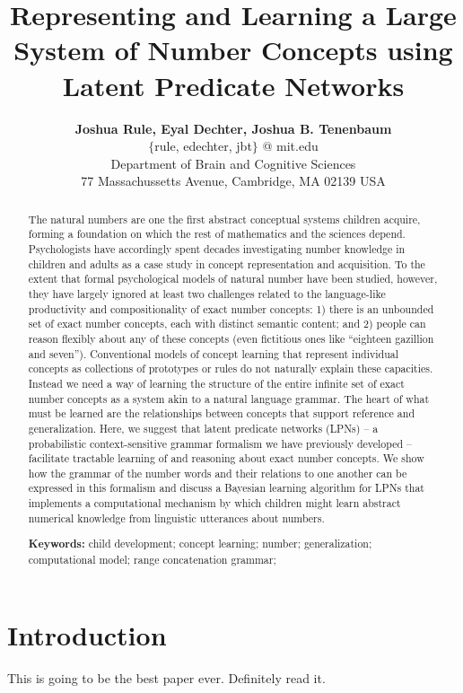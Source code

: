 \documentclass[10pt,letterpaper]{article}
\title{Representing and Learning a Large System of Number Concepts using Latent Predicate Networks}
\author{{\large \bf Joshua Rule, Eyal Dechter, Joshua B. Tenenbaum} \\
  $\{$rule, edechter, jbt$\}$ @ mit.edu \\
  Department of Brain and Cognitive Sciences\\
  77 Massachussetts Avenue, Cambridge, MA 02139 USA}
\begin{document}
\maketitle

\begin{abstract}
  The natural numbers are one the first abstract conceptual systems
  children acquire, forming a foundation on which the rest of
  mathematics and the sciences depend. Psychologists have accordingly
  spent decades investigating number knowledge in children and adults
  as a case study in concept representation and acquisition. To the
  extent that formal psychological models of natural number have been
  studied, however, they have largely ignored at least two challenges
  related to the language-like productivity and compositionality of
  exact number concepts: 1) there is an unbounded set of exact number
  concepts, each with distinct semantic content; and 2) people can
  reason flexibly about any of these concepts (even fictitious ones
  like “eighteen gazillion and seven”). Conventional models of concept
  learning that represent individual concepts as collections of
  prototypes or rules do not naturally explain these
  capacities. Instead we need a way of learning the structure of the
  entire infinite set of exact number concepts as a system akin to a
  natural language grammar. The heart of what must be learned are the
  relationships between concepts that support reference and
  generalization. Here, we suggest that latent predicate networks
  (LPNs) -- a probabilistic context-sensitive grammar formalism we
  have previously developed -- facilitate tractable learning of and
  reasoning about exact number concepts. We show how the grammar of
  the number words and their relations to one another can be expressed
  in this formalism and discuss a Bayesian learning algorithm for LPNs
  that implements a computational mechanism by which children might
  learn abstract numerical knowledge from linguistic utterances about
  numbers.

  \textbf{Keywords:}
  child development; concept learning; number; generalization;
  computational model; range concatenation grammar;
\end{abstract}

\section{Introduction}

This is going to be the best paper ever. Definitely read it.
\end{document}

